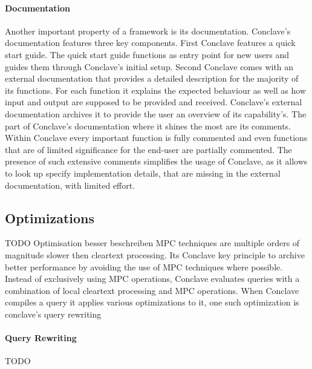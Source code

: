 \paragraph{Documentation}
Another important property of a framework is its documentation. Conclave's documentation features three key components. First Conclave features a quick start guide. The quick start guide functions as entry point for new users and guides them through Conclave's initial setup. 
Second Conclave comes with an external documentation that provides a detailed description for the majority of its functions. For each function it explains the expected behaviour as well as how input and output are supposed to be provided and received. Conclave's external documentation archives it to provide the user an overview of its capability's. 
The part of Conclave's documentation where it shines the most are its comments. Within Conclave every important function is fully commented and even functions that are of limited significance for the end-user are partially commented. The presence of such extensive comments simplifies the usage of Conclave, as it allows to look up specify implementation details, that are missing in the external documentation, with limited effort.            


\subsection{Optimizations} TODO Optimisation besser beschreiben 
MPC techniques are multiple orders of magnitude slower then cleartext processing. Its Conclave key principle to archive better performance by avoiding the use of MPC techniques where possible. Instead of exclusively using MPC operations, Conclave evaluates queries with a combination of local cleartext processing and MPC operations. When Conclave compiles a query it applies various optimizations to it, one such optimization is conclave's query rewriting 
\paragraph{Query Rewriting} TODO

